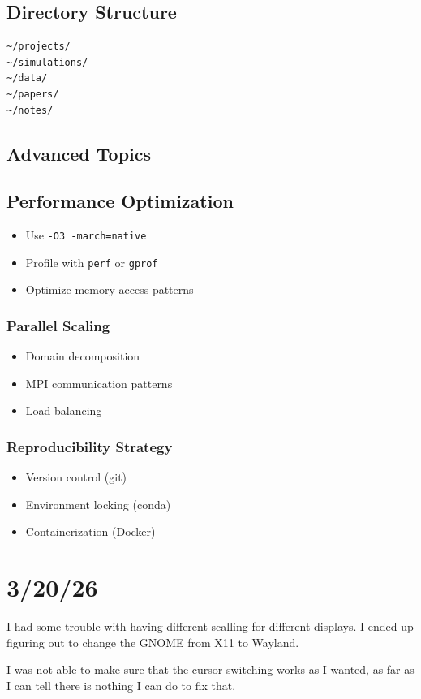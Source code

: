 \subsection{Directory Structure}

\begin{lstlisting}
~/projects/
~/simulations/
~/data/
~/papers/
~/notes/
\end{lstlisting}

\subsection{Advanced Topics}

\subsection{Performance Optimization}

\begin{itemize}
    \item Use \texttt{-O3 -march=native}
    \item Profile with \texttt{perf} or \texttt{gprof}
    \item Optimize memory access patterns
\end{itemize}

\subsubsection{Parallel Scaling}

\begin{itemize}
    \item Domain decomposition
    \item MPI communication patterns
    \item Load balancing
\end{itemize}

\subsubsection{Reproducibility Strategy}

\begin{itemize}
    \item Version control (git)
    \item Environment locking (conda)
    \item Containerization (Docker)
\end{itemize}


\section{3/20/26}

I had some trouble with having different scalling for different displays. I ended up figuring out to change the GNOME from X11 to Wayland.

I was not able to make sure that the cursor switching works as I wanted, as far as I can tell there is nothing I can do to fix that.
